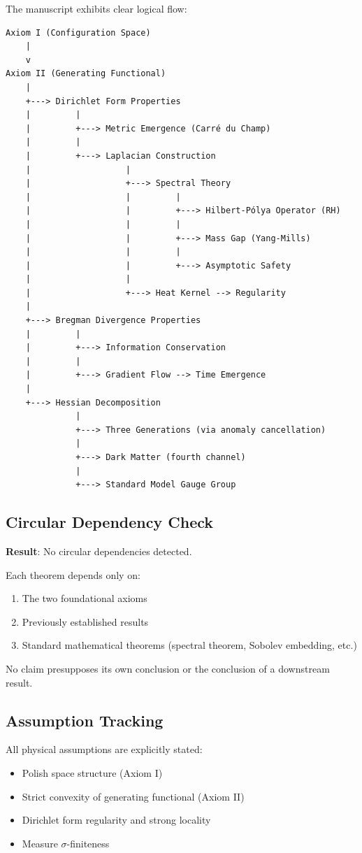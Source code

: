 \documentclass[11pt,a4paper]{article}
\theoremstyle{definition}
\begin{document}
The manuscript exhibits clear logical flow:

\begin{verbatim}
Axiom I (Configuration Space)
    |
    v
Axiom II (Generating Functional)
    |
    +---> Dirichlet Form Properties
    |         |
    |         +---> Metric Emergence (Carré du Champ)
    |         |
    |         +---> Laplacian Construction
    |                   |
    |                   +---> Spectral Theory
    |                   |         |
    |                   |         +---> Hilbert-Pólya Operator (RH)
    |                   |         |
    |                   |         +---> Mass Gap (Yang-Mills)
    |                   |         |
    |                   |         +---> Asymptotic Safety
    |                   |
    |                   +---> Heat Kernel --> Regularity
    |
    +---> Bregman Divergence Properties
    |         |
    |         +---> Information Conservation
    |         |
    |         +---> Gradient Flow --> Time Emergence
    |
    +---> Hessian Decomposition
              |
              +---> Three Generations (via anomaly cancellation)
              |
              +---> Dark Matter (fourth channel)
              |
              +---> Standard Model Gauge Group
\end{verbatim}

\subsection{Circular Dependency Check}

\textbf{Result}: No circular dependencies detected.

Each theorem depends only on:
\begin{enumerate}
    \item The two foundational axioms
    \item Previously established results
    \item Standard mathematical theorems (spectral theorem, Sobolev embedding, etc.)
\end{enumerate}

No claim presupposes its own conclusion or the conclusion of a downstream result.

\subsection{Assumption Tracking}

All physical assumptions are explicitly stated:
\begin{itemize}
    \item Polish space structure (Axiom I)
    \item Strict convexity of generating functional (Axiom II)
    \item Dirichlet form regularity and strong locality
    \item Measure $\sigma$-finiteness
\end{itemize}
\end{document}
